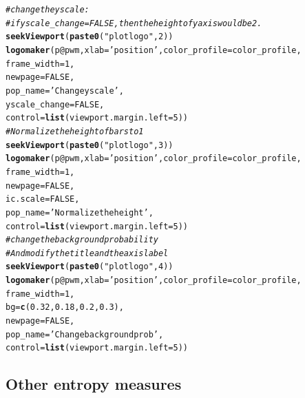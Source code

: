\documentclass[12pt]{article}\usepackage[]{graphicx}\usepackage[usenames,dvipsnames]{color}
\makeatletter
\newcommand{\hlnum}[1]{\textcolor[rgb]{0.686,0.059,0.569}{#1}}%
\newcommand{\hlstr}[1]{\textcolor[rgb]{0.192,0.494,0.8}{#1}}%
\newcommand{\hlcom}[1]{\textcolor[rgb]{0.678,0.584,0.686}{\textit{#1}}}%
\newcommand{\hlopt}[1]{\textcolor[rgb]{0,0,0}{#1}}%
\newcommand{\hlstd}[1]{\textcolor[rgb]{0.345,0.345,0.345}{#1}}%
\newcommand{\hlkwc}[1]{\textcolor[rgb]{0.333,0.667,0.333}{#1}}%
\newcommand{\hlkwd}[1]{\textcolor[rgb]{0.737,0.353,0.396}{\textbf{#1}}}%
\newenvironment{kframe}{%
 \def\at@end@of@kframe{}%
 \ifinner\ifhmode%
  \def\at@end@of@kframe{\end{minipage}}%
  \begin{minipage}{\columnwidth}%
 \fi\fi%
 \def\FrameCommand##1{\hskip\@totalleftmargin \hskip-\fboxsep
 \colorbox{shadecolor}{##1}\hskip-\fboxsep
     \hskip-\linewidth \hskip-\@totalleftmargin \hskip\columnwidth}%
 \MakeFramed {\advance\hsize-\width
   \@totalleftmargin\z@ \linewidth\hsize
   \@setminipage}}%
 {\par\unskip\endMakeFramed%
 \at@end@of@kframe}
\newenvironment{knitrout}{}{} %
\makeatother
\begin{document}
\begin{knitrout}
\begin{kframe}
\begin{alltt}
\hlcom{#change the y scale:}
\hlcom{#if yscale_change = FALSE, then the height of y axis would be 2.}
\hlkwd{seekViewport}\hlstd{(}\hlkwd{paste0}\hlstd{(}\hlstr{"plotlogo"}\hlstd{,} \hlnum{2}\hlstd{))}
\hlkwd{logomaker}\hlstd{(p}\hlopt{@}\hlkwc{pwm}\hlstd{,}\hlkwc{xlab} \hlstd{=} \hlstr{'position'}\hlstd{,}\hlkwc{color_profile} \hlstd{= color_profile,}
          \hlkwc{frame_width} \hlstd{=} \hlnum{1}\hlstd{,}
          \hlkwc{newpage} \hlstd{=} \hlnum{FALSE}\hlstd{,}
          \hlkwc{pop_name} \hlstd{=} \hlstr{'Change y scale'}\hlstd{,}
          \hlkwc{yscale_change} \hlstd{=} \hlnum{FALSE}\hlstd{,}
          \hlkwc{control} \hlstd{=} \hlkwd{list}\hlstd{(}\hlkwc{viewport.margin.left} \hlstd{=} \hlnum{5}\hlstd{))}
\hlcom{#Normalize the height of bars to 1}
\hlkwd{seekViewport}\hlstd{(}\hlkwd{paste0}\hlstd{(}\hlstr{"plotlogo"}\hlstd{,} \hlnum{3}\hlstd{))}
\hlkwd{logomaker}\hlstd{(p}\hlopt{@}\hlkwc{pwm}\hlstd{,}\hlkwc{xlab} \hlstd{=} \hlstr{'position'}\hlstd{,}\hlkwc{color_profile} \hlstd{= color_profile,}
          \hlkwc{frame_width} \hlstd{=} \hlnum{1}\hlstd{,}
          \hlkwc{newpage} \hlstd{=} \hlnum{FALSE}\hlstd{,}
          \hlkwc{ic.scale} \hlstd{=} \hlnum{FALSE}\hlstd{,}
          \hlkwc{pop_name} \hlstd{=} \hlstr{'Normalize the height'}\hlstd{,}
          \hlkwc{control} \hlstd{=} \hlkwd{list}\hlstd{(}\hlkwc{viewport.margin.left} \hlstd{=} \hlnum{5}\hlstd{))}
\hlcom{#change the background probability}
\hlcom{#And modify the title and the axis label}
\hlkwd{seekViewport}\hlstd{(}\hlkwd{paste0}\hlstd{(}\hlstr{"plotlogo"}\hlstd{,} \hlnum{4}\hlstd{))}
\hlkwd{logomaker}\hlstd{(p}\hlopt{@}\hlkwc{pwm}\hlstd{,}\hlkwc{xlab} \hlstd{=} \hlstr{'position'}\hlstd{,}\hlkwc{color_profile} \hlstd{= color_profile,}
          \hlkwc{frame_width} \hlstd{=} \hlnum{1}\hlstd{,}
          \hlkwc{bg}\hlstd{=}\hlkwd{c}\hlstd{(}\hlnum{0.32}\hlstd{,} \hlnum{0.18}\hlstd{,} \hlnum{0.2}\hlstd{,} \hlnum{0.3}\hlstd{),}
          \hlkwc{newpage} \hlstd{=} \hlnum{FALSE}\hlstd{,}
          \hlkwc{pop_name} \hlstd{=} \hlstr{'Change background prob'}\hlstd{,}
          \hlkwc{control} \hlstd{=} \hlkwd{list}\hlstd{(}\hlkwc{viewport.margin.left} \hlstd{=} \hlnum{5}\hlstd{))}
\end{alltt}
\end{kframe}
\end{knitrout}


\subsection{Other entropy measures}
\end{document}

